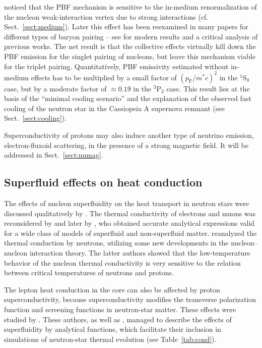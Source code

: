 \documentclass[smallextended]{svjour3}       %
\newcommand{\pF}{p_\mathrm{F}}
\newcommand{\singlet}{\mbox{$^1$S$_0$ }}
\newcommand{\triplet}{\mbox{$^3$P$_2$}}
\begin{document}
\citet{VoskresenskySenatorov87} noticed that the PBF
mechanism is sensitive to the in-medium renormalization of
the nucleon weak-interaction vertex due to strong
interactions (cf.{} Sect.~\ref{sect:medium}). Later this
effect has been reexamined in many papers for different
types of baryon pairing -- see \citet{Leinson09,Leinson10}
for modern results and a critical analysis of previous
works. The net result is that the collective effects
virtually kill down the PBF emission for the singlet pairing
of nucleons, but leave this mechanism viable for the triplet
pairing. Quantitatively, PBF emissivity estimated without
in-medium effects \citep{YKL99} has to be multiplied by a
small factor of $(\pF/m^* c)^2$ in the \singlet{} case, but
by a moderate factor of $\approx0.19$ in the \triplet{}
case. This result lies at the basis of the ``minimal cooling
scenario'' and the explanation of the observed fast cooling
of the neutron star in the Cassiopeia A supernova remnant
(see Sect.~\ref{sect:cooling}).

Superconductivity of protons may also induce another type of
neutrino emission, electron-fluxoid scattering, in the
presence of a strong magnetic field. It will be addressed in
Sect.~\ref{sect:numag}.

\subsection{Superfluid effects on heat conduction}
\label{sect:SFcond}

The effects of nucleon superfluidity on the heat transport
in neutron stars were discussed qualitatively by
\citet{FlowersItoh76,FlowersItoh81}. The thermal
conductivity of electrons and muons was reconsidered by
\citet{GnedinYakovlev95} and later by
\citet{ShterninYakovlev07}, who obtained accurate analytical
expressions valid for a wide class of models of superfluid
and non-superfluid matter. \citet{BaikoHY01} reanalyzed the
thermal conduction by neutrons, utilizing some new
developments in the  nucleon--nucleon interaction theory.
The latter authors showed that the low-temperature behavior
of the nucleon thermal conductivity is very sensitive to the
relation between critical temperatures of neutrons and
protons.

The lepton heat conduction in the core can also be affected
by proton superconductivity, because superconductivity modifies
the transverse polarization function and screening
functions in neutron-star matter. These effects were studied by
\citet{ShterninYakovlev07}. These authors, as well as
\citet{BaikoHY01}, managed to describe the effects of
superfluidity by analytical functions, which facilitate
their inclusion in simulations of neutron-star thermal
evolution (see Table~\ref{tab:cond}).
\end{document}
